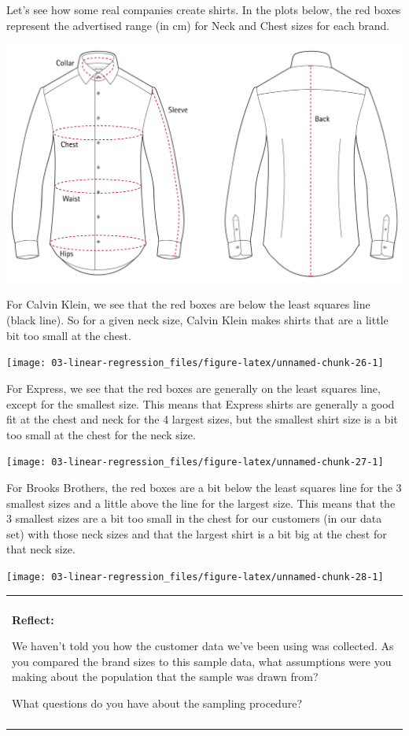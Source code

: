 \documentclass[
]{book}
\newenvironment{reflect}
{
    \begin{center}
    
    \begin{tabular}{|p{0.8\textwidth}|}
    \rowcolor{LightBlue}
    \hline\\
    \rowcolor{LightBlue}
    \textbf{Reflect:}
}
{
    \\\rowcolor{LightBlue}
    \\\hline
    \end{tabular} 
    \end{center}
}
\begin{document}
Let's see how some real companies create shirts. In the plots below, the red boxes represent the advertised range (in cm) for Neck and Chest sizes for each brand.

\begin{center}\includegraphics[width=.25\textwidth]{Photos/shirtchart} \end{center}

For Calvin Klein, we see that the red boxes are below the least squares line (black line). So for a given neck size, Calvin Klein makes shirts that are a little bit too small at the chest.

\begin{center}\texttt{[image: 03-linear-regression\_files/figure-latex/unnamed-chunk-26-1]} \end{center}

For Express, we see that the red boxes are generally on the least squares line, except for the smallest size. This means that Express shirts are generally a good fit at the chest and neck for the 4 largest sizes, but the smallest shirt size is a bit too small at the chest for the neck size.

\begin{center}\texttt{[image: 03-linear-regression\_files/figure-latex/unnamed-chunk-27-1]} \end{center}

For Brooks Brothers, the red boxes are a bit below the least squares line for the 3 smallest sizes and a little above the line for the largest size. This means that the 3 smallest sizes are a bit too small in the chest for our customers (in our data set) with those neck sizes and that the largest shirt is a bit big at the chest for that neck size.

\begin{center}\texttt{[image: 03-linear-regression\_files/figure-latex/unnamed-chunk-28-1]} \end{center}

\begin{reflect}
We haven't told you how the customer data we've been using was
collected. As you compared the brand sizes to this sample data, what
assumptions were you making about the population that the sample was
drawn from?

What questions do you have about the sampling procedure?
\end{reflect}
\end{document}
